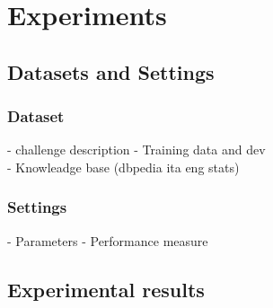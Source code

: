 \chapter{Experiments}


\section{Datasets and Settings}
	\subsection{Dataset}
	- challenge description	
	- Training data and dev\\
	- Knowleadge base (dbpedia ita eng stats)
	\subsection{Settings}
	- Parameters
	- Performance measure

\section{Experimental results}
